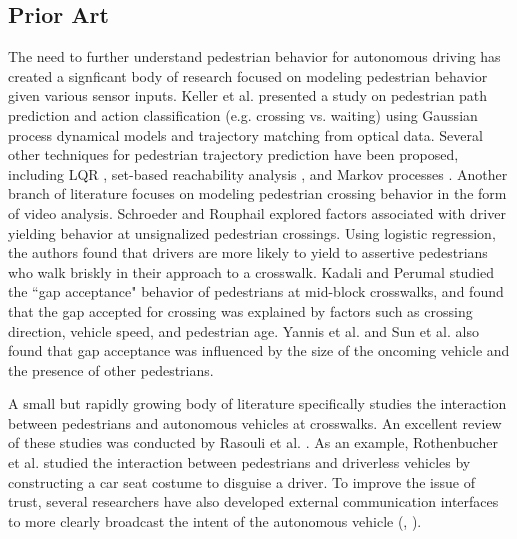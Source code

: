 \documentclass[letterpaper, 10 pt, conference]{ieeeconf} %
\begin{document}
\subsection{Prior Art}

The need to further understand pedestrian behavior for autonomous driving has created a signficant body of research focused on modeling pedestrian behavior given various sensor inputs. Keller et al. \cite{Keller2014} presented a study on pedestrian path prediction and action classification (e.g. crossing vs. waiting) using Gaussian process dynamical models and trajectory matching from optical data. Several other techniques for pedestrian trajectory prediction have been proposed, including LQR \cite{Batkovic}, set-based reachability analysis \cite{Koschi2018}, and Markov processes \cite{Karasev2016}. Another branch of literature focuses on modeling pedestrian crossing behavior in the form of video analysis. Schroeder and Rouphail \cite{Schroeder2011} explored factors associated with driver yielding behavior at unsignalized pedestrian crossings. Using logistic regression, the authors found that drivers are more likely to yield to assertive pedestrians who walk briskly in their approach to a crosswalk. Kadali and Perumal \cite{RaghuramKadali2012} studied the ``gap acceptance" behavior of pedestrians at mid-block crosswalks, and found that the gap accepted for crossing was explained by factors such as crossing direction, vehicle speed, and pedestrian age. Yannis et al. \cite{Yannis2013} and Sun et al.\cite{Sun2002} also found that gap acceptance was influenced by the size of the oncoming vehicle and the presence of other pedestrians. 

A small but rapidly growing body of literature specifically studies the interaction between pedestrians and autonomous vehicles at crosswalks. An excellent review of these studies was conducted by Rasouli et al. \cite{Rasouli}. As an example, Rothenbucher et al. \cite{Rothenbucher2016} studied the interaction between pedestrians and driverless vehicles by constructing a car seat costume to disguise a driver. To improve the issue of trust, several researchers have also developed external communication interfaces to more clearly broadcast the intent of the autonomous vehicle (\cite{Matthews}, \cite{Lagstrom2015}). 
\end{document}
